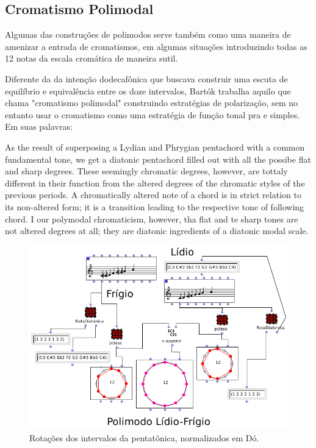 \documentclass[
	12pt,				%
	openright,			%
	twoside,			%
	a4paper,			%
	english,			%
	french,				%
	spanish,			%
	brazil				%
	]{abntex2}
\begin{document}
\subsection{Cromatismo Polimodal}

Algumas das construções de polimodos serve também como uma maneira de amenizar a entrada de cromatismos, em algumas situações introduzindo todas as 12 notas da escala cromática de maneira sutil. 

Diferente da da intenção dodecafônica que buscava construir uma escuta de equilíbrio e equivalência entre os doze intervalos, Bartók trabalha aquilo que chama "cromatismo polimodal" construindo estratégias de polarização, sem no entanto usar o cromatismo como uma estratégia de função tonal pra e simples. Em suas palavras:

\begin{citacao}
As the result of superposing a Lydian and Phrygian pentachord with a common fundamental tone, we get a diatonic pentachord filled out with all the possibe flat and sharp degrees. These seemingly chromatic degrees, however, are tottaly different in their function from the altered degrees of the chromatic styles of the previous periods. A chromatically altered note of a chord is in strict relation to its non-altered form; it is a transition leading to the respective tone of following chord. I our polymodal chromaticism, however, tha flat and te sharp tones are not altered degrees at all; they are diatonic ingredients of a diatonic modal scale.\cite[ p.367]{bartok1993bela} 
\end{citacao}


\begin{figure}[!h]
	\caption{\label{fig_grafico}Rotações dos intervalos da pentatônica, normalizados em Dó. }
	\begin{center}
	    \includegraphics[scale=0.5]{modal/lidiofrigioOM.png}
	\end{center}
\end{figure}
\end{document}
